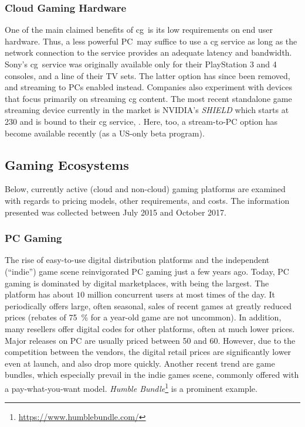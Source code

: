\subsubsection{Cloud Gaming Hardware}
One of the main claimed benefits of \gls{cg} is its low requirements
on end user hardware. Thus, a less powerful \gls{PC} may suffice to
use a \gls{cg} service as long as the network connection to the
service provides an adequate latency and bandwidth.
Sony's \psnow \gls{cg} service was originally available only for their
PlayStation 3 and 4 consoles, and a line of their TV sets. The latter
option has since been removed, and streaming to \glspl{PC} enabled
instead.
Companies also experiment with devices that focus primarily on streaming
\gls{cg} content. The most recent standalone game streaming device currently
in the market is NVIDIA's \textit{SHIELD} which starts at
\SI{230}[\EUR]{} and is bound to their \gls{cg} service, \gfnow.
Here, too, a stream-to-\gls{PC} option has become available recently
(as a US-only beta program).



\subsection{Gaming Ecosystems}
Below, currently active (cloud and non-cloud) gaming platforms are examined
with regards to pricing models, other requirements, and costs. The
information presented was collected between July 2015 and October 2017.

\subsubsection{\gls{PC} Gaming}
\label{sec:pcgaming}

The rise of easy-to-use digital distribution platforms and the
independent (``indie'') game scene reinvigorated \gls{PC} gaming just a few
years ago. Today, \gls{PC} gaming is dominated by digital marketplaces,
with \steam being the largest. The platform has about $10$ million
concurrent users at most times of the day. It periodically offers large,
often seasonal, sales of recent games at greatly reduced prices (rebates
of \SI{75}{\percent} for a year-old game are not uncommon). In addition, many
resellers offer digital codes for other platforms, often at much lower
prices.
Major releases on PC are usually priced between \SI{50}[\EUR]{}
and \SI{60}[\EUR]{}. However, due to the competition between the
vendors, the digital retail prices are significantly lower even at
launch, and also drop more quickly. Another recent trend are game
bundles, which especially prevail in the indie games scene, commonly
offered with a pay-what-you-want model. \textit{Humble
Bundle}\footnote{\url{https://www.humblebundle.com/}} is a prominent
example.

